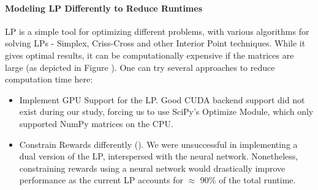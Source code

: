 \paragraph{Modeling LP Differently to Reduce Runtimes} LP is a simple tool for optimizing different problems, with various algorithms for solving LPs - Simplex, Criss-Cross and other Interior Point techniques. While it gives optimal results, it can be computationally expensive if the matrices are large (as depicted in Figure ). One can try several approaches to reduce computation time here:
\begin{itemize}
    \item Implement GPU Support for the LP. Good CUDA backend support did not exist during our study, forcing us to use SciPy's Optimize Module, which only supported NumPy matrices on the CPU.
    \item Constrain Rewards differently (). We were unsuccessful in implementing a dual version of the LP, interspersed with the neural network. Nonetheless, constraining rewards using a neural network would drastically improve performance as the current LP accounts for $\approx$ 90\% of the total runtime.
\end{itemize}